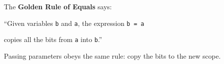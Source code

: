 The \textbf{Golden Rule of Equals} says:

\hspace{10mm}``Given variables \lstinline$b$ and \lstinline$a$, the expression \lstinline$b = a$

\hspace{10mm} copies all the bits from \lstinline$a$ into \lstinline$b$.''

Passing parameters obeys the same rule: copy the bits to the new scope.
